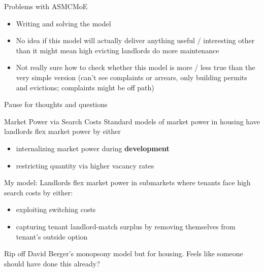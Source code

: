 \documentclass[10pt, xcolor=dvipsnames]{beamer}
\begin{document}
\begin{frame}{Problems with ASMCMoE}
    \begin{itemize}
        \item Writing and solving the model
        \item No idea if this model will actually deliver anything useful / interesting other than it might mean high evicting landlords do more maintenance
        \item Not really sure how to check whether this model is more / less true than the very simple version (can't see complaints or arrears, only building permits and evictions; complaints might be off path)
    \end{itemize}
    
\end{frame}

\begin{frame}{Pause for thoughts and questions}
    
\end{frame}

\begin{frame}{Market Power via Search Costs}
    Standard models of market power in housing have landlords flex market power by either \\
    \begin{itemize}
        \item internalizing market power during \textbf{development}
        \item restricting quantity via higher vacancy rates
    \end{itemize} 
    \pause
    \vspace{0.25cm}
    My model: Landlords flex market power in submarkets where tenants face high search costs by either:
    \begin{itemize}
        \item exploiting switching costs 
        \item capturing tenant landlord-match surplus by removing themselves from tenant's outside option
    \end{itemize}
    \vspace{0.25cm}
    Rip off David Berger's monopsony model but for housing. Feels like someone should have done this already?
\end{frame}





    
\end{document}
